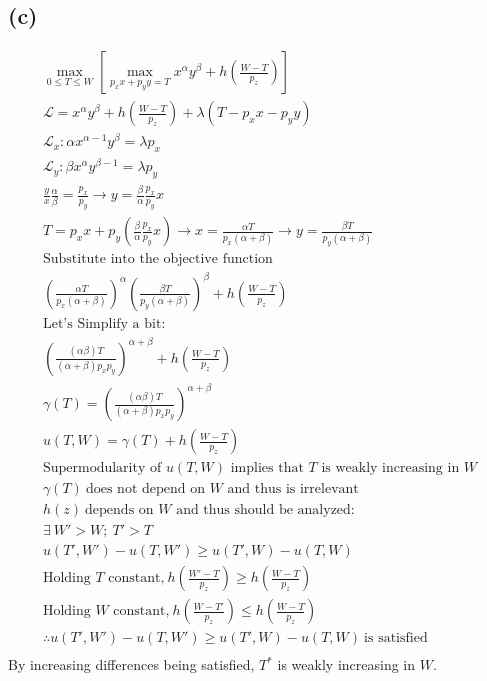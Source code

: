 \documentclass[10pt, a4paper]{article}
\begin{document}
    \subsection*{(c)}
      \begin{gather*}
        {\max_{0\leq T \leq W}} [\max_{p_xx + p_yy = T} x^{\alpha}y^{\beta} + h(\frac{W-T}{p_z})] \\
        \mathcal{L} = x^{\alpha}y^{\beta} + h(\frac{W-T}{p_z}) + \lambda(T-p_xx-p_yy)\\
        \mathcal{L}_x: \alpha x^{\alpha-1}y^{\beta} = \lambda p_x \\
        \mathcal{L}_y: \beta x^{\alpha}y^{\beta-1} = \lambda p_y \\
        \frac{y}{x}\frac{\alpha}{\beta} = \frac{p_x}{p_y} \rightarrow y = \frac{\beta}{\alpha}\frac{p_x}{p_y}x \\
        T = p_xx + p_y(\frac{\beta}{\alpha}\frac{p_x}{p_y}x) \rightarrow x = \frac{\alpha T}{p_x(\alpha+\beta)} \rightarrow y = \frac{\beta T}{p_y(\alpha+\beta)} \\
        \text{Substitute into the objective function} \\
        \left(\frac{\alpha T}{p_x(\alpha+\beta)}\right)^{\alpha}\left(\frac{\beta T}{p_y(\alpha+\beta)}\right)^{\beta} + h(\frac{W-T}{p_z}) \\
        \text{Let's Simplify a bit:} \\
        \left(\frac{(\alpha\beta)T}{(\alpha+\beta)p_xp_y}\right)^{\alpha+\beta} + h(\frac{W-T}{p_z}) \\
        \gamma(T) = \left(\frac{(\alpha\beta)T}{(\alpha+\beta)p_xp_y}\right)^{\alpha+\beta} \\
        u(T,W) = \gamma(T) + h(\frac{W-T}{p_z}) \\
        \text{Supermodularity of $u(T,W)$ implies that $T$ is weakly increasing in $W$} \\
        \gamma(T) \ \text{does not depend on $W$ and thus is irrelevant} \\
        h(z) \ \text{depends on $W$ and thus should be analyzed:} \\
        \exists \ W'>W ; \ T'>T \\
        u(T',W') - u(T, W') \geq u(T',W) - u(T,W) \\
        \text{Holding $T$ constant,} \ h(\frac{W'-T}{p_z}) \geq h(\frac{W-T}{p_z}) \\
        \text{Holding $W$ constant,} \ h(\frac{W-T'}{p_z}) \leq h(\frac{W-T}{p_z}) \\
        \therefore u(T',W') - u(T, W') \geq u(T',W) - u(T,W) \ \text{is satisfied}\\
      \end{gather*}
      By increasing differences being satisfied, $T^*$ is weakly increasing in $W$.
\end{document}
